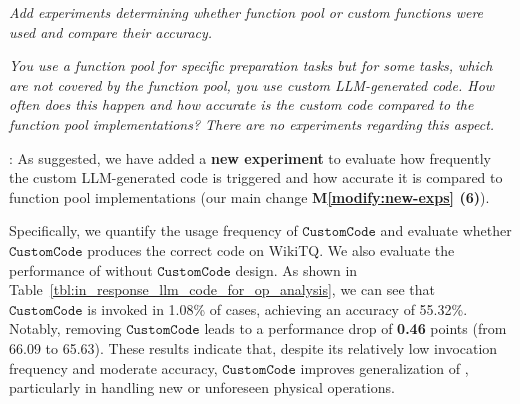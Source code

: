 \begin{shaded}
{
\emph{Add experiments determining whether function pool or custom functions were used and compare their accuracy.}

 \emph{You use a function pool for specific preparation tasks but for some tasks, which are not covered by the function pool, you use custom LLM-generated code. How often does this happen and how accurate is the custom code compared to the function pool implementations? There are no experiments regarding this aspect.}

}
\end{shaded}



: 
As suggested, we have added a \textbf{new experiment} to evaluate how frequently the custom LLM-generated code is triggered and how accurate it is compared to function pool implementations (our main change \textbf{M\ref{modify:new-exps} (6)}).

Specifically, we quantify the usage frequency of $\mathtt{CustomCode}$ and evaluate whether $\mathtt{CustomCode}$ produces the correct code on WikiTQ.
We also evaluate the performance of \sys without $\mathtt{CustomCode}$ design. 
%
As shown in Table~\ref{tbl:in_response_llm_code_for_op_analysis}, we can see that $\mathtt{CustomCode}$ is invoked in 1.08\% of cases, achieving an accuracy of 55.32\%. Notably, removing $\mathtt{CustomCode}$ leads to a performance drop of \textbf{0.46}  points (from 66.09 to 65.63). These results indicate that, despite its relatively low invocation frequency and moderate accuracy, $\mathtt{CustomCode}$ improves generalization of \sys, particularly in handling new or unforeseen physical operations.

\inresponse{

}







